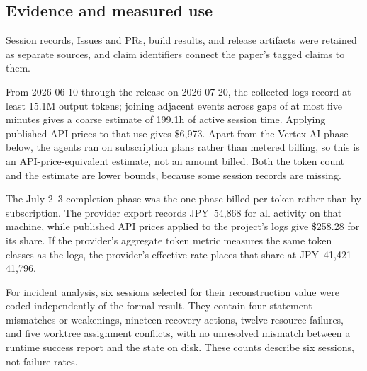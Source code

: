\subsection{Evidence and measured use}

Session records, Issues and PRs, build results, and release artifacts
were retained as separate sources, and claim identifiers connect the
paper's tagged claims to them. %

From 2026-06-10 through the release on 2026-07-20, the collected logs
record at least 15.1M output tokens; joining adjacent events across gaps of
at most five minutes gives a coarse estimate of 199.1h of active session
time. Applying published API prices to that use gives \$6{,}973. Apart from
the Vertex AI phase below, the agents ran on subscription plans rather
than metered billing, so this is an API-price-equivalent estimate, not an
amount billed. Both the token count and the estimate are lower bounds,
because some session records are missing. %

The July 2--3 completion phase was the one phase billed per token rather
than by subscription. The provider export records JPY~54{,}868 for all
activity on that machine, while published API prices applied to the
project's logs give \$258.28 for its share. If the provider's aggregate
token metric measures the same token classes as the logs, the provider's
effective rate places that share at JPY~41{,}421--41{,}796.

For incident analysis, six sessions selected for their reconstruction
value were coded independently of the formal result. They contain four
statement mismatches or weakenings, nineteen recovery actions, twelve
resource failures, and five worktree assignment conflicts, with no
unresolved mismatch between a runtime success report and the state on
disk. These counts describe six sessions, not failure rates. %
